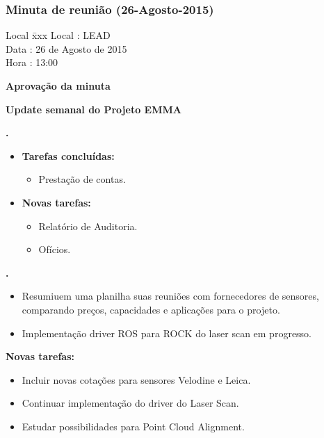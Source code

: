 \subsubsection{Minuta de reunião (26-Agosto-2015)}

\begin{tabbing}
  Local \= xxx \kill
  Local \> : LEAD \\
  Data  \> : 26 de Agosto de 2015 \\
  Hora  \> : 13:00
\end{tabbing}


\textbf{Aprovação da minuta}

\textbf{Update semanal do Projeto EMMA}
   							
\textbf{\alana.} 
	\begin{itemize}
		\item \textbf{Tarefas concluídas:}
			\begin{itemize}    
				\item Prestação de contas.
			\end{itemize}
		
		\item \textbf{Novas tarefas:}
			\begin{itemize} 
				\item Relatório de Auditoria.
				\item Ofícios.
			\end{itemize}
	\end{itemize}   		
						
\textbf{\gabriel.} 
	\begin{itemize}
			\item Resumiuem uma planilha suas reuniões com fornecedores de sensores,
			comparando preços, capacidades e aplicações para o projeto.
			\item Implementação driver ROS para ROCK do laser scan em progresso.
			\end{itemize}
		
		\item \textbf{Novas tarefas:}
			\begin{itemize} 
				\item Incluir novas cotações para sensores Velodine e Leica.
				\item Continuar implementação do driver do Laser Scan.
				\item Estudar possibilidades para Point Cloud Alignment.
			\end{itemize}


